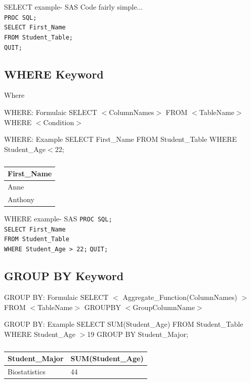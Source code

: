 \documentclass{beamer}
\begin{document}
	\begin{frame}{SELECT example- SAS}
		Code fairly simple... \\ \pause 
		\texttt{PROC SQL;} \\
		\texttt{SELECT First\_Name } \\
		\texttt{FROM Student\_Table;}\\
		\texttt{QUIT;}
	\end{frame}
	
	\subsection{WHERE Keyword}
	\begin{frame}{Where}
		\begin{block}{WHERE: Formulaic}
			SELECT $<$ColumnNames$>$ FROM $<$TableName$>$ 
			WHERE $<$Condition$>$
		\end{block}
		\begin{block}{WHERE: Example}
			SELECT First\_Name FROM Student\_Table 
			WHERE Student\_Age$<$22;
		\end{block}
	\begin{table}[H]
	\centering
	\caption*{}

	\begin{tabular}{|l|}
		\hline
		First\_Name  \\ \hline
		Anne  \\ \hline
		Anthony  \\    \hline
	\end{tabular}
	\end{table}		
	\end{frame}
	
	\begin{frame}{WHERE example- SAS}
		\texttt{PROC SQL;} \\
		\texttt{SELECT First\_Name } \\
		\texttt{FROM Student\_Table}\\
		\texttt{WHERE Student\_Age > 22;} 
		\texttt{QUIT;}
	\end{frame}
		\subsection{GROUP BY Keyword}
		\begin{frame}
		\begin{block}{GROUP BY: Formulaic}
			SELECT $<$ Aggregate\_Function(ColumnNames) $>$ FROM $<$TableName$>$ GROUPBY $<$GroupColumnName$>$
		\end{block}
		\begin{block}{GROUP BY: Example}
			SELECT SUM(Student\_Age) FROM Student\_Table WHERE Student\_Age $>$19 GROUP BY Student\_Major;
		\end{block}
		\begin{table}[H]
			\centering
			\caption*{}

			\begin{tabular}{|l|l|}
				\hline
				Student\_Major & SUM(Student\_Age)  \\ \hline
				Biostatistics  & 44 \\ \hline
			\end{tabular}
		\end{table}			
		\end{frame}
		
\end{document}
